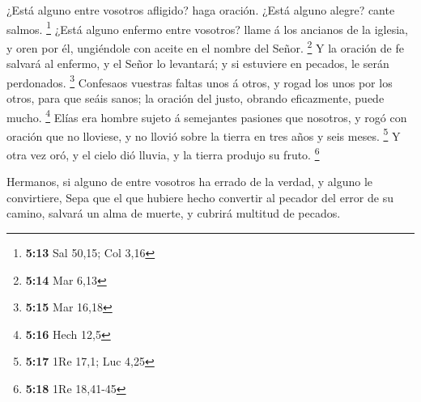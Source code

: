  ¿Está alguno entre vosotros afligido? haga oración.
¿Está alguno alegre? cante salmos. \footnote{\textbf{5:13} Sal 50,15;
  Col 3,16}  ¿Está alguno enfermo entre vosotros? llame á
los ancianos de la iglesia, y oren por él, ungiéndole con aceite en el
nombre del Señor. \footnote{\textbf{5:14} Mar 6,13}  Y la
oración de fe salvará al enfermo, y el Señor lo levantará; y si
estuviere en pecados, le serán perdonados. \footnote{\textbf{5:15} Mar
  16,18}  Confesaos vuestras faltas unos á otros, y rogad
los unos por los otros, para que seáis sanos; la oración del justo,
obrando eficazmente, puede mucho. \footnote{\textbf{5:16} Hech 12,5}
 Elías era hombre sujeto á semejantes pasiones que
nosotros, y rogó con oración que no lloviese, y no llovió sobre la
tierra en tres años y seis meses. \footnote{\textbf{5:17} 1Re 17,1; Luc
  4,25}  Y otra vez oró, y el cielo dió lluvia, y la
tierra produjo su fruto. \footnote{\textbf{5:18} 1Re 18,41-45}

 Hermanos, si alguno de entre vosotros ha errado de la
verdad, y alguno le convirtiere,  Sepa que el que hubiere
hecho convertir al pecador del error de su camino, salvará un alma de
muerte, y cubrirá multitud de pecados.
